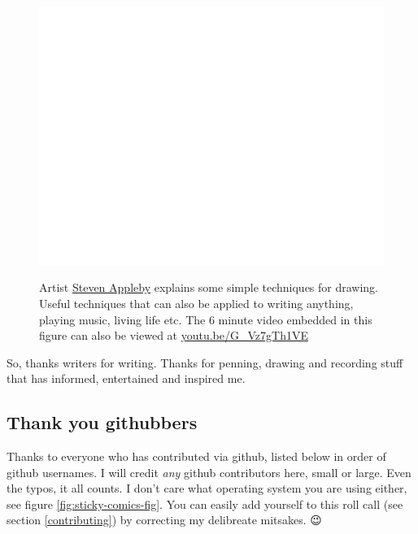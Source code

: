 \documentclass[
]{book}
\begin{document}
\begin{figure}

{\centering \href{https://www.youtube.com/embed/G_Vz7gTh1VE}{\includegraphics[width=0.99\linewidth]{cdyf_files/figure-latex/appleby-fig-1} }

}

\caption{Artist \href{https://en.wikipedia.org/wiki/Steven_Appleby}{Steven Appleby} explains some simple techniques for drawing. Useful techniques that can also be applied to writing anything, playing music, living life etc. The 6 minute video embedded in this figure can also be viewed at \href{https://youtu.be/G_Vz7gTh1VE}{youtu.be/G\_Vz7gTh1VE} \citep{stevenappleby}}\label{fig:appleby-fig}
\end{figure}



So, thanks writers for writing. Thanks for penning, drawing and recording stuff that has informed, entertained and inspired me. 🙏

\hypertarget{github}{%
\subsection{Thank you githubbers}\label{github}}

Thanks to everyone who has contributed via github, listed below in order of github usernames. I will credit \emph{any} github contributors here, small or large. Even the typos, it all counts. I don't care what operating system you are using either, see figure \ref{fig:sticky-comics-fig}. You can easily add yourself to this roll call (see section \ref{contributing}) by correcting my delibreate mitsakes. 😉
\end{document}
